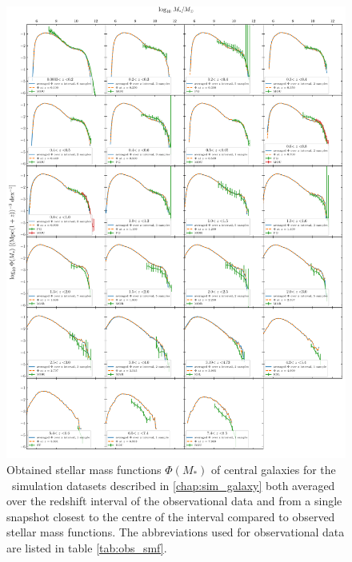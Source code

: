 \begin{appendices}
\begin{figure}[H]
	\centering
	\includegraphics[width=\textwidth]{images/smf/smf-G69-central-average.pdf}%
	\caption{
		Obtained stellar mass functions $\Phi(M_*)$ of central galaxies for the \gsmall\ simulation datasets described in \ref{chap:sim_galaxy} both averaged over the redshift interval of the observational data and from a single snapshot closest to the centre of the interval compared to observed stellar mass functions.
		The abbreviations used for observational data are listed in table \ref{tab:obs_smf}.
	}%
	\label{fig:smf-central-average}
\end{figure}




\end{appendices}